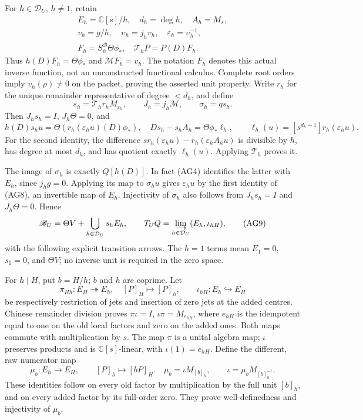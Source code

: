For $h\in\mathcal D_U$, $h\ne1$, retain
\[
 \begin{gathered}
 E_h=\mathbb C[s]/h,\quad d_h=\deg h,\quad A_h=M_s,\\
 v_h=g/h,\quad \upsilon_h=j_hv_h,\quad
 \varepsilon_h=\upsilon_h^{-1},\\
 F_h=S_h^{\mathscr B}\Theta\phi_*,\quad
 \mathcal T_hP=P(D)F_h.
 \end{gathered}
 \tag{AG6}
\]
Thus $h(D)F_h=\Theta\phi_*$ and $\mathcal MF_h=v_h$.
The notation $F_h$ denotes this actual inverse function, not an
unconstructed functional calculus.  Complete root orders imply
$v_h(\rho)\ne0$ on the packet, proving the asserted unit property.
Write $r_h$ for the unique remainder representative of degree $<d_h$,
and define
\[
 s_h=\mathcal T_h r_h M_{\varepsilon_h},\qquad
 J_h=j_h\mathcal M,\qquad \sigma_h=qs_h.
 \tag{AG7}
\]
Then $J_hs_h=I$, $J_h\Theta=0$, and
\[
 h(D)s_hu=\Theta(r_h(\varepsilon_hu)(D)\phi_*),\quad
 D s_h-s_hA_h=\Theta\phi_*\ell_h,
 \qquad\ell_h(u)=[s^{d_h-1}]r_h(\varepsilon_hu).
 \tag{AG8}
\]
For the second identity, the difference
$s r_h(\varepsilon_hu)-r_h(\varepsilon_h A_hu)$ is divisible
by $h$, has degree at most $d_h$, and has quotient exactly
$\ell_h(u)$.  Applying $\mathcal T_h$ proves it.

The image of $\sigma_h$ is exactly $Q[h(D)]$.  In fact (AG4)
identifies the latter with $E_h$, since $j_hg=0$.  Applying its
map to $\sigma_hu$ gives $\varepsilon_hu$ by the first identity
of (AG8), an invertible map of $E_h$.  Injectivity of $\sigma_h$
also follows from $J_hs_h=I$ and $J_h\Theta=0$.  Hence
\[
 \mathscr B_U=\Theta V+\bigcup_{h\in\mathcal D_U}s_hE_h,
 \qquad
 T_UQ=\varinjlim_{h\in\mathcal D_U}(E_h,\iota_{hH}),
 \tag{AG9}
\]
with the following explicit transition arrows.  The $h=1$ terms
mean $E_1=0$, $s_1=0$, and $\Theta V$; no inverse unit is required
in the zero space.

For $h\mid H$, put $b=H/h$; $b$ and $h$ are coprime.  Let
\[
 \pi_{Hh}:E_H\twoheadrightarrow E_h,\quad[P]_H\mapsto[P]_h,
 \qquad
 \iota_{hH}:E_h\hookrightarrow E_H
 \tag{AG10}
\]
be respectively restriction of jets and insertion of zero jets at
the added centres.  Chinese remainder division proves
$\pi\iota=I$, $\iota\pi=M_{e_{hH}}$, where $e_{hH}$ is the
idempotent equal to one on the old local factors and zero on the
added ones.  Both maps commute with multiplication by $s$.
The map $\pi$ is a unital algebra map; $\iota$ preserves products
and is $\mathbb C[s]$-linear, with $\iota(1)=e_{hH}$.
Define the different, raw numerator map
\[
 \mu_b:E_h\to E_H,\qquad[P]_h\mapsto[bP]_H.
 \quad
 \mu_b=\iota M_{[b]_h},\qquad
 \iota=\mu_b M_{[b]_h^{-1}}.
 \tag{AG11}
\]
These identities follow on every old factor by multiplication by
the full unit $[b]_h$, and on every added factor by its full-order
zero.  They prove well-definedness and injectivity of $\mu_b$.

